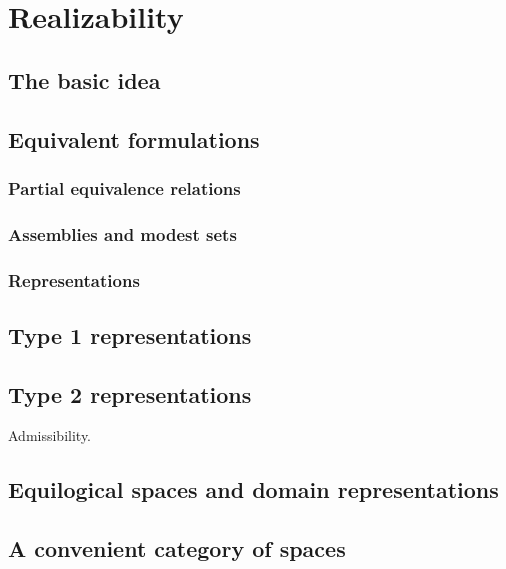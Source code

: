 \chapter{Realizability}
\label{chap:realizability}

\section{The basic idea}
\label{sec:realizability-basic-idea}

\section{Equivalent formulations}
\label{sec:representations-formulations}

\subsection{Partial equivalence relations}
\label{sec:pers}

\subsection{Assemblies and modest sets}
\label{sec:assemblies}

\subsection{Representations}
\label{sec:representations}


\section{Type 1 representations}
\label{sec:type-1-representations}

\section{Type 2 representations}
\label{sec:tte-representations}

Admissibility.

\section{Equilogical spaces and domain representations}
\label{sec:equilogical-spaces}

\section{A convenient category of spaces}
\label{sec:qcb-spaces}



